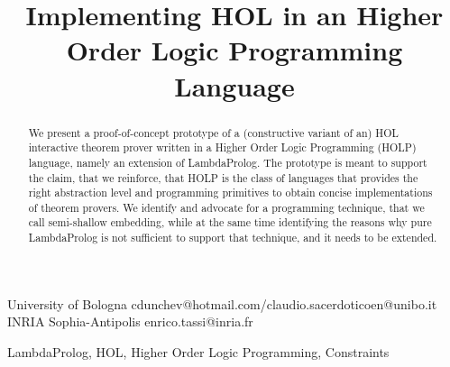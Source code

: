 \documentclass[preprint]{sigplanconf}
\begin{document}
\setlength{\pdfpageheight}{\paperheight}
\setlength{\pdfpagewidth}{\paperwidth}




\title{Implementing HOL in an Higher Order Logic Programming Language}

           {University of Bologna}
           {cdunchev@hotmail.com/claudio.sacerdoticoen@unibo.it}
           {INRIA Sophia-Antipolis}
           {enrico.tassi@inria.fr}

\maketitle

\begin{abstract}
We present a proof-of-concept prototype of a (constructive variant of an) HOL interactive theorem prover written in a Higher Order Logic Programming (HOLP) language, namely an extension of LambdaProlog. The prototype is meant to support the claim, that we reinforce, that HOLP is the class of languages that provides the right abstraction level and programming primitives to obtain concise implementations of theorem provers. We identify and advocate for a programming technique, that we call semi-shallow embedding, while at the same time identifying the reasons why pure LambdaProlog is not sufficient to support that technique, and it needs to be extended.
\end{abstract}



\keywords
LambdaProlog, HOL, Higher Order Logic Programming, Constraints
\end{document}
